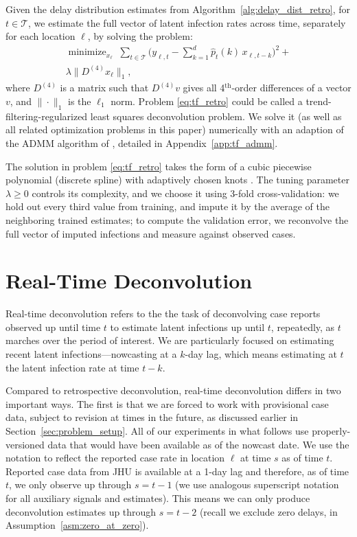 \documentclass[sts]{imsart}
\def\T{\mathsf{T}}
\newcommand{\minimize}{\mathop{\mathrm{minimize}}}
\def\hx{\hat{x}}
\def\hp{\hat{p}}
\def\T{\mathcal{T}}
\def\th{^\mathrm{th}}
\theoremstyle{plain}
\theoremstyle{definition}
\theoremstyle{remark}
\begin{document}
Given the delay distribution estimates from
Algorithm~\ref{alg:delay_dist_retro}, \smash{$\hp_t = (\hp_t(1), \ldots, 
  \hp_t(d))$} for $t \in \T$, we estimate the full vector \smash{$x_\ell =
  (x_{\ell,t})_{t \in \T}$} of latent infection rates across time, separately
for each location $\ell$, by solving the problem:   
\begin{multline}
\label{eq:tf_retro}
\minimize_{x_\ell} \; \sum_{t \in \T} \bigg( y_{\ell,t} - \sum_{k=1}^d \hp_t(k)
\, x_{\ell, t-k} \bigg)^2 +{} \\ \lambda \|D^{(4)} x_\ell\|_1,   
\end{multline}
where $D^{(4)}$ is a matrix such that $D^{(4)} v$ gives all 4$\th$-order
differences of a vector $v$, and $\|\cdot\|_1$ is the $\ell_1$ norm. Problem 
\eqref{eq:tf_retro} could be called a trend-filtering-regularized least squares 
deconvolution problem. We solve it (as well as all related optimization problems
in this paper) numerically with an adaption of the ADMM algorithm of 
\citet{ramdas2016fast}, detailed in Appendix~\ref{app:tf_admm}. 

The solution \smash{$\hx_\ell$} in problem \eqref{eq:tf_retro} takes the form of
a cubic piecewise polynomial (discrete spline) with adaptively chosen
knots \citep{tibshirani2014adaptive, tibshirani2020divided}. The tuning
parameter $\lambda \geq 0$ controls its complexity, and we choose it using  
3-fold cross-validation: we hold out every third value from training, and impute
it by the average of the neighboring trained estimates; to compute the
validation error, we reconvolve the full vector of imputed infections and
measure against observed cases. 
 
\section{Real-Time Deconvolution}
\label{sec:deconv_realtime}

Real-time deconvolution refers to the the task of deconvolving case reports
observed up until time $t$ to estimate latent infections up until $t$,
repeatedly, as $t$ marches over the period of interest. We are particularly
focused on estimating recent latent infections---nowcasting at a $k$-day lag,
which means estimating at $t$ the latent infection rate at time $t-k$.

Compared to retrospective deconvolution, real-time deconvolution differs in two
important ways. The first is that we are forced to work with provisional case
data, subject to revision at times in the future, as discussed earlier in
Section~\ref{sec:problem_setup}. All of our experiments in what follows use
properly-versioned data that would have been available as of the nowcast date.
We use the notation  to reflect the reported case rate
in location $\ell$ at time $s$ as of time $t$. Reported case data from JHU is
available at a 1-day lag and therefore, as of time $t$, we only observe
 up through $s=t-1$ (we use analogous superscript
notation for all auxiliary signals and estimates). This means we can only
produce deconvolution estimates \smash{$\hx^{(t)}_{\ell,s}$} up through $s=t-2$ 
(recall we exclude zero delays, in Assumption~\ref{asm:zero_at_zero}). 
\end{document}
